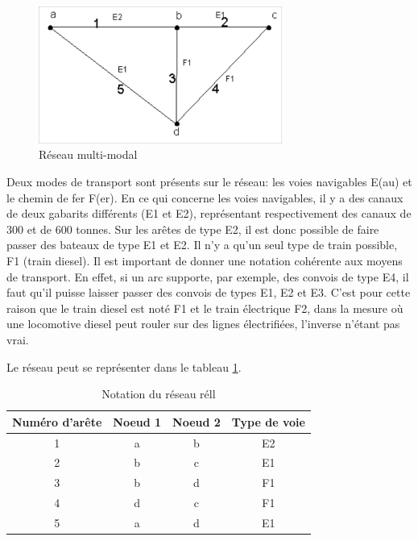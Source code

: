 \begin{figure}[htbp]
\centerline{\includegraphics[width=8cm]{f3_3.png}}
\caption{\label{f3_3} R\'eseau multi-modal}
\end{figure}

Deux modes de transport sont présents sur le réseau: les voies
navigables E(au) et le chemin de fer F(er). En ce qui concerne les
voies navigables, il y a des canaux de deux gabarits différents (E1
et E2), représentant respectivement des canaux de 300 et de 600
tonnes. Sur les arêtes de type E2, il est donc possible de faire
passer des bateaux de type E1 et E2. Il n'y a qu'un seul type de
train possible, F1 (train diesel). Il est important de donner une
notation cohérente aux moyens de transport. En effet, si un arc
supporte, par exemple, des convois de type E4, il faut qu'il puisse
laisser passer des convois de types E1, E2 et E3. C'est pour cette
raison que le train diesel est noté F1 et le train électrique F2,
dans la mesure où une locomotive diesel peut rouler sur des lignes
électrifiées, l'inverse n'étant pas vrai.

Le réseau peut se représenter dans le tableau \ref{tab3_1}.

\begin{table}[htbp]
\begin{center}
\begin{tabular}{cccc}
\hline
Numéro d'arête & Noeud 1 & Noeud 2 & Type de voie\\
\hline
1 & a & b & E2\\

2 & b & c & E1\\

3 & b & d & F1\\

4 & d & c & F1\\

5 & a & d & E1\\
\hline
\end{tabular}
\caption{\label{tab3_1} Notation du r\'eseau r\'ell }
\end{center}
\end{table}


